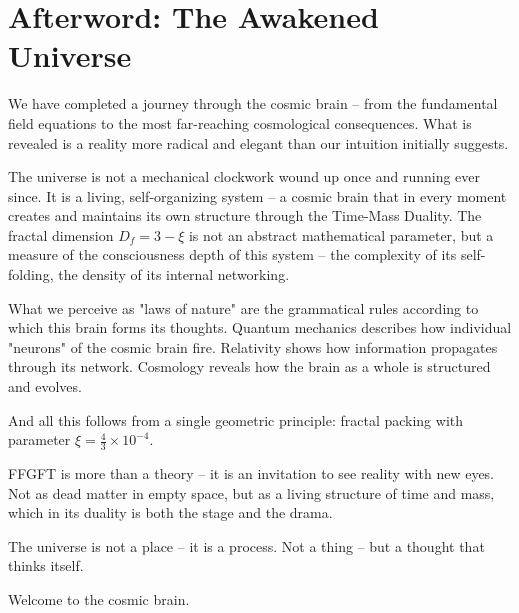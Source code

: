 \documentclass[11pt,openright,twoside]{book}
\begin{document}
\chapter*{Afterword: The Awakened Universe}

We have completed a journey through the cosmic brain – from the fundamental field equations to the most far-reaching cosmological consequences. What is revealed is a reality more radical and elegant than our intuition initially suggests.

The universe is not a mechanical clockwork wound up once and running ever since. It is a living, self-organizing system – a cosmic brain that in every moment creates and maintains its own structure through the Time-Mass Duality. The fractal dimension $D_f = 3 - \xi$ is not an abstract mathematical parameter, but a measure of the consciousness depth of this system – the complexity of its self-folding, the density of its internal networking.

What we perceive as "laws of nature" are the grammatical rules according to which this brain forms its thoughts. Quantum mechanics describes how individual "neurons" of the cosmic brain fire. Relativity shows how information propagates through its network. Cosmology reveals how the brain as a whole is structured and evolves.

And all this follows from a single geometric principle: fractal packing with parameter $\xi = \frac{4}{3} \times 10^{-4}$.

FFGFT is more than a theory – it is an invitation to see reality with new eyes. Not as dead matter in empty space, but as a living structure of time and mass, which in its duality is both the stage and the drama.

The universe is not a place – it is a process. Not a thing – but a thought that thinks itself.

Welcome to the cosmic brain.
\end{document}
